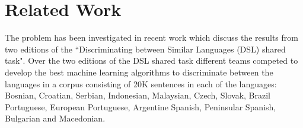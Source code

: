 \section{Related Work}

The problem has been investigated in recent work \cite{DSLEvaluation}\cite{DSL2015} which discuss the results from two editions of the ``Discriminating between Similar Languages (DSL) shared task". Over the two editions of the DSL shared task different teams competed to develop the best machine learning algorithms to discriminate between the languages in a corpus consisting of 20K sentences in each of the languages: Bosnian, Croatian, Serbian, Indonesian, Malaysian, Czech, Slovak, Brazil Portuguese, European Portuguese, Argentine Spanish, Peninsular Spanish, Bulgarian and Macedonian.\\